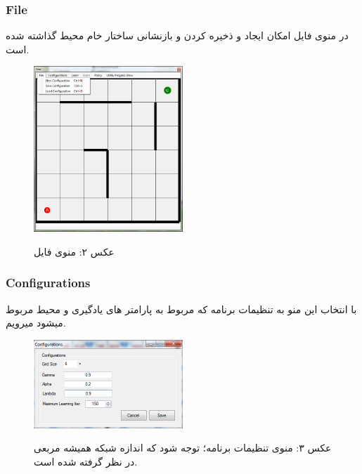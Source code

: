 \documentclass[10pt,a4paper]{article}
\begin{document}
\begin{Arabic}
        \subsubsection{File}
در منوی فایل امکان ایجاد و ذخیره کردن و بازنشانی ساختار خام محیط گذاشته شده است.
\begin{figure}[H]
    \centering
    \includegraphics[width=0.5\textwidth]{file-menu}
    \begin{center}
    \textarabic{عکس ۲: منوی فایل}
    \end{center}
\end{figure}
    \subsubsection{Configurations}
    با انتخاب این منو به تنظیمات برنامه که مربوط به پارامتر های یادگیری و محیط مربوط میشود میرویم.
\begin{figure}[H]
    \centering
    \includegraphics[width=0.5\textwidth]{conf}
    \begin{center}
    \textarabic{عکس ۳: منوی تنظیمات برنامه؛ توجه شود که اندازه شبکه همیشه مربعی در نظر گرفته شده است.}
    \end{center}
\end{figure}

\end{Arabic}
\end{document}
